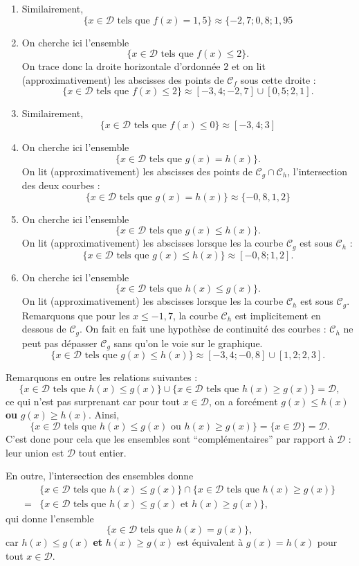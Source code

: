 \documentclass[a4paper, 14pt]{extarticle}
\theoremstyle{plain}
\theoremstyle{definition}
\newcommand{\C}{\mathcal{C}}
\newcommand{\D}{\mathcal{D}}
\begin{document}
{\begin{enumerate}
			\item Similairement,
				\[ \{ x \in \D \text{ tels que } f(x) = 1,5 \} \approx \{ {-2,7}; {0,8} ; {1,95} \]
				
			\item On cherche ici l'ensemble
				\[ \{ x \in \D \text{ tels que } f(x) \leq 2 \}. \]
			On trace donc la droite horizontale d'ordonnée $2$ et on lit (approximativement) les abscisses des points de $\C_f$ sous cette droite : 
				\[ \{ x \in \D \text{ tels que } f(x) \leq 2 \} \approx [{-3,4} ; {-2,7} ] \cup [ {0,5} ; {2,1} ].  \]
			\item Similairement,
				\[ \{ x \in \D \text{ tels que } f(x) \leq 0 \} \approx [{-3,4} ; {3} ]  \]
			\item On cherche ici l'ensemble
				\[ \{ x \in \D \text{ tels que } g(x) = h(x) \}. \]
			On lit (approximativement) les abscisses des points de $\C_g \cap \C_h$, l'intersection des deux courbes :
				\[ \{ x \in \D \text{ tels que } g(x) = h(x) \} \approx \{ {-0,8}, {1,2} \} \]
			\item On cherche ici l'ensemble
				\[ \{ x \in \D \text{ tels que } g(x) \leq h(x) \}. \]
			On lit (approximativement) les abscisses lorsque les la courbe $\C_g$ est sous $\C_h$ :
				\[ \{ x \in \D \text{ tels que } g(x) \leq h(x) \} \approx [ {-0,8} ; {1,2} ]. \]
			\item On cherche ici l'ensemble
				\[ \{ x \in \D \text{ tels que } h(x) \leq g(x) \}. \]
			On lit (approximativement) les abscisses lorsque les la courbe $\C_h$ est sous $\C_g$.
			Remarquons que pour les $x\leq-1,7$, la courbe $\C_h$ est implicitement en dessous de $\C_g$.
			On fait en fait une hypothèse de continuité des courbes : $\C_h$ ne peut pas dépasser $\C_g$ sans qu'on le voie sur le graphique.
				\[ \{ x \in \D \text{ tels que } g(x) \leq h(x) \} \approx [{-3,4} ; {-0,8} ] \cup [ {1,2} ; {2,3} ]. \]
		\end{enumerate}
		
		Remarquons en outre les relations suivantes :
			\[ \{ x \in \D \text{ tels que } h(x) \leq g(x) \} \cup \{ x \in \D \text{ tels que } h(x) \geq g(x) \} = \D, \]
		ce qui n'est pas  surprenant car pour tout $x\in\D$, on a forcément $g(x) \leq h(x)$ \textbf{ou} $g(x) \geq h(x)$. 
		Ainsi, 
			\[ \{ x \in \D \text{ tels que } h(x) \leq g(x) \text{ ou }  h(x) \geq g(x) \}  = \{ x \in \D \} = \D. \]
		C'est donc pour cela que les ensembles sont ``complémentaires'' par rapport à $\D$ : leur union est $\D$ tout entier.
		
		En outre, l'intersection des ensembles donne
			\begin{align*}
			 & \{ x \in \D \text{ tels que } h(x) \leq g(x) \} \cap \{ x \in \D \text{ tels que } h(x) \geq g(x) \} \\
			 =& \{ x \in \D \text{ tels que } h(x) \leq g(x) \text{ et } h(x) \geq g(x) \},
			 \end{align*}
		qui donne l'ensemble
			\[ \{ x \in \D \text{ tels que } h(x) = g(x) \}, \]
		car $h(x) \leq g(x)$ \textbf{et} $h(x) \geq g(x)$ est équivalent à $g(x) = h(x)$ pour tout $x\in\D$.
		
}
\end{document}
